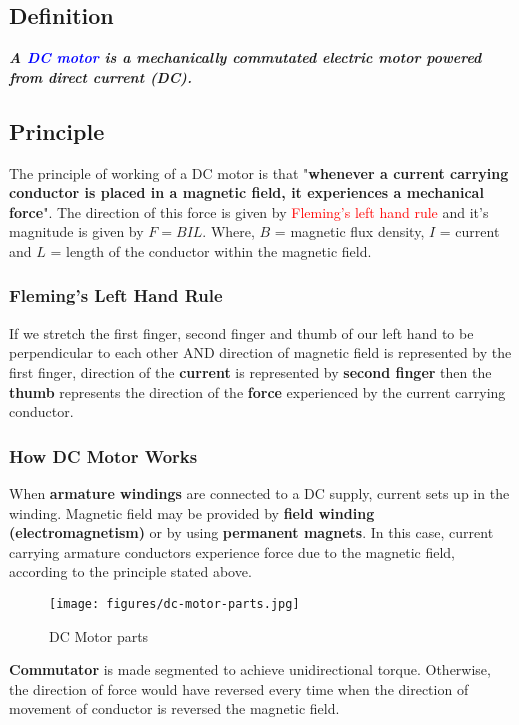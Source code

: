 \documentclass{article}
\begin{document}
\subsection{Definition}
\textit{\textbf{A \textcolor{blue}{DC motor} is a mechanically commutated electric motor
powered from direct current (DC).}}

\subsection{Principle}
The principle of working of a DC motor is that "\textbf{whenever a current carrying conductor is placed in a magnetic field, it experiences a mechanical force}". The direction of this force is given by \textcolor{red}{Fleming's left hand rule} and it's magnitude is given by \textbf{$F = BIL$}. Where, $B$ = magnetic flux density, $I$ = current and $L$ = length of the conductor within the magnetic field.
\subsubsection{Fleming's Left Hand Rule}
If we stretch the first finger, second finger and thumb of our left hand to be perpendicular to each other AND direction of magnetic field is represented by the first finger, direction of the \textbf{current} is represented by \textbf{second finger} then the \textbf{thumb} represents the direction of the \textbf{force} experienced by the current carrying conductor.
\subsubsection{How DC Motor Works}
When \textbf{armature windings} are connected to a DC supply, current sets up in the winding. Magnetic field may be provided by \textbf{field winding (electromagnetism)} or by using \textbf{permanent magnets}. In this case, current carrying armature conductors experience force due to the magnetic field, according to the principle stated above.
\begin{figure}[h]
  \centering
   \texttt{[image: figures/dc-motor-parts.jpg]}
    \caption{DC Motor parts}
    \label{fig:my_label}
\end{figure}

\textbf{Commutator} is made segmented to achieve unidirectional torque. Otherwise, the direction of force would have reversed every time when the direction of movement of conductor is reversed the magnetic field.
\end{document}
